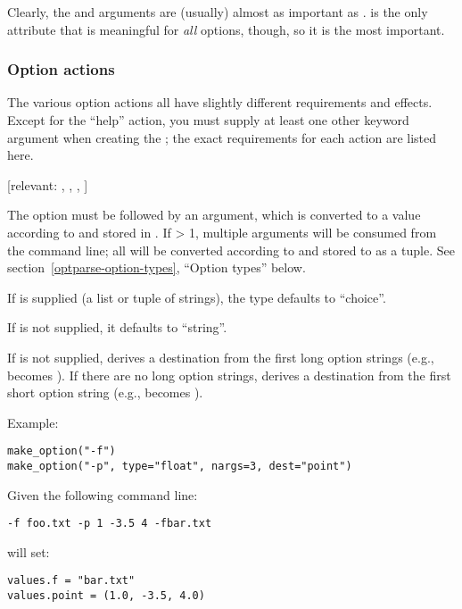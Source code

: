 Clearly, the  and  arguments are (usually) almost
as important as .   is the only attribute that
is meaningful for \emph{all} options, though, so it is the most
important.

\subsubsection{Option actions\label{optparse-option-actions}}

The various option actions all have slightly different requirements
and effects.  Except for the ``help'' action, you must supply at least
one other keyword argument when creating the ; the exact
requirements for each action are listed here.

\begin{definitions}
 [relevant: , , , ]

The option must be followed by an argument, which is converted to a
value according to  and stored in .  If
 > 1, multiple arguments will be consumed from the command
line; all will be converted according to  and stored to
 as a tuple.  See section~\ref{optparse-option-types},
``Option types'' below.

If  is supplied (a list or tuple of strings), the type
defaults to ``choice''.

If  is not supplied, it defaults to ``string''.

If  is not supplied,  derives a
destination from the first long option strings (e.g.,
 becomes ).  If there are no long
option strings,  derives a destination from the first
short option string (e.g.,  becomes ).

Example:

\begin{verbatim}
make_option("-f")
make_option("-p", type="float", nargs=3, dest="point")
\end{verbatim}

Given the following command line:

\begin{verbatim}
-f foo.txt -p 1 -3.5 4 -fbar.txt
\end{verbatim}

 will set:

\begin{verbatim}
values.f = "bar.txt"
values.point = (1.0, -3.5, 4.0)
\end{verbatim}


\end{definitions}
